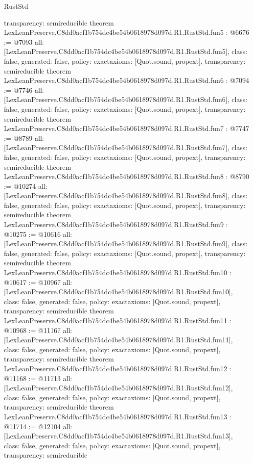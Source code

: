 \begin{lexlean}{RustStd}
\begin{coremodule}
{  transparency: semireducible
}
theorem LexLeanPreserve.C8dd0acf1b754dc4be54b0618978d097d.R1.RustStd.fun5 : @6676 := @7093 {
  all: [LexLeanPreserve.C8dd0acf1b754dc4be54b0618978d097d.R1.RustStd.fun5],
  class: false,
  generated: false,
  policy: exact{axioms: [Quot.sound, propext]},
  transparency: semireducible
}
theorem LexLeanPreserve.C8dd0acf1b754dc4be54b0618978d097d.R1.RustStd.fun6 : @7094 := @7746 {
  all: [LexLeanPreserve.C8dd0acf1b754dc4be54b0618978d097d.R1.RustStd.fun6],
  class: false,
  generated: false,
  policy: exact{axioms: [Quot.sound, propext]},
  transparency: semireducible
}
theorem LexLeanPreserve.C8dd0acf1b754dc4be54b0618978d097d.R1.RustStd.fun7 : @7747 := @8789 {
  all: [LexLeanPreserve.C8dd0acf1b754dc4be54b0618978d097d.R1.RustStd.fun7],
  class: false,
  generated: false,
  policy: exact{axioms: [Quot.sound, propext]},
  transparency: semireducible
}
theorem LexLeanPreserve.C8dd0acf1b754dc4be54b0618978d097d.R1.RustStd.fun8 : @8790 := @10274 {
  all: [LexLeanPreserve.C8dd0acf1b754dc4be54b0618978d097d.R1.RustStd.fun8],
  class: false,
  generated: false,
  policy: exact{axioms: [Quot.sound, propext]},
  transparency: semireducible
}
theorem LexLeanPreserve.C8dd0acf1b754dc4be54b0618978d097d.R1.RustStd.fun9 : @10275 := @10616 {
  all: [LexLeanPreserve.C8dd0acf1b754dc4be54b0618978d097d.R1.RustStd.fun9],
  class: false,
  generated: false,
  policy: exact{axioms: [Quot.sound, propext]},
  transparency: semireducible
}
theorem LexLeanPreserve.C8dd0acf1b754dc4be54b0618978d097d.R1.RustStd.fun10 : @10617 := @10967 {
  all: [LexLeanPreserve.C8dd0acf1b754dc4be54b0618978d097d.R1.RustStd.fun10],
  class: false,
  generated: false,
  policy: exact{axioms: [Quot.sound, propext]},
  transparency: semireducible
}
theorem LexLeanPreserve.C8dd0acf1b754dc4be54b0618978d097d.R1.RustStd.fun11 : @10968 := @11167 {
  all: [LexLeanPreserve.C8dd0acf1b754dc4be54b0618978d097d.R1.RustStd.fun11],
  class: false,
  generated: false,
  policy: exact{axioms: [Quot.sound, propext]},
  transparency: semireducible
}
theorem LexLeanPreserve.C8dd0acf1b754dc4be54b0618978d097d.R1.RustStd.fun12 : @11168 := @11713 {
  all: [LexLeanPreserve.C8dd0acf1b754dc4be54b0618978d097d.R1.RustStd.fun12],
  class: false,
  generated: false,
  policy: exact{axioms: [Quot.sound, propext]},
  transparency: semireducible
}
theorem LexLeanPreserve.C8dd0acf1b754dc4be54b0618978d097d.R1.RustStd.fun13 : @11714 := @12104 {
  all: [LexLeanPreserve.C8dd0acf1b754dc4be54b0618978d097d.R1.RustStd.fun13],
  class: false,
  generated: false,
  policy: exact{axioms: [Quot.sound, propext]},
  transparency: semireducible
}
\end{coremodule}
\end{lexlean}
